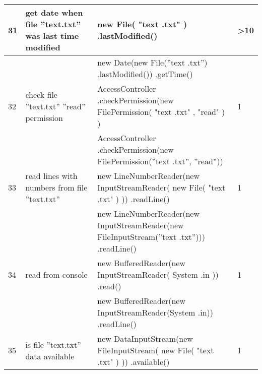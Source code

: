 \begin{longtable}{|p{}|p{}|p{}|p{}|}
		\rowcolor[HTML]{FFCCC9} 
		31                                & get date when file ”text.txt” was last time modified   & new File( "text .txt" )  .lastModified()                                                                         & \textgreater{}10                        \\ \hline
		\rowcolor[HTML]{9AFF99} 
		&                                                        & new Date(new File(”text .txt”) .lastModified()) .getTime()                                                       &                                         \\ \hline
		\rowcolor[HTML]{FFCCC9} 
		32                                & check file ”text.txt” ”read” permission                & AccessController .checkPermission(new FilePermission( "text .txt" , "read" ) )                                   & 1                                       \\ \hline
		\rowcolor[HTML]{9AFF99} 
		&                                                        & AccessController .checkPermission(new FilePermission(”text .txt”, ”read”))                                       &                                         \\ \hline
		\rowcolor[HTML]{FFCCC9} 
		33                                & read lines with numbers from file ”text.txt”           & new LineNumberReader(new InputStreamReader( new File( "text .txt" ) )) .readLine()                               & 1                                       \\ \hline
		\rowcolor[HTML]{9AFF99} 
		&                                                        & new LineNumberReader(new InputStreamReader(new FileInputStream(”text .txt”))) .readLine()                        &                                         \\ \hline
		\rowcolor[HTML]{FFCCC9} 
		34                                & read from console                                      & new BufferedReader(new InputStreamReader( System .in )) .read()                                                  & 1                                       \\ \hline
		\rowcolor[HTML]{9AFF99} 
		&                                                        & new BufferedReader(new InputStreamReader(System .in)) .readLine()                                                &                                         \\ \hline
		\rowcolor[HTML]{FFCCC9} 
		35                                & is file ”text.txt” data available                      & new DataInputStream(new FileInputStream( new File( "text .txt" ) )) .available()                                 & 1                                       \\ \hline

\end{longtable}
